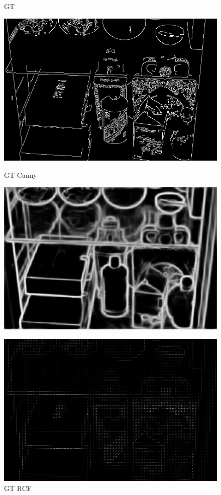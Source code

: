 \documentclass[CJK,aspectratio=169]{beamer}  %
\begin{document}
\begin{frame}
\begin{figure}
\begin{minipage}{.19\textwidth}
				\captionsetup{font=scriptsize}
				\label{fig: GI}
				\caption*{GT}
			\end{minipage}
			\begin{minipage}{.19\textwidth}
				\centering
				\includegraphics[width=.8\linewidth]{picture/LLIE/My Architecture/Edge Detection/normal00044_canny}
				\captionsetup{font=scriptsize}
				\label{fig: GT_canny}	
				\caption*{GT Canny}
			\end{minipage}
			\begin{minipage}{.19\textwidth}
				\centering
				\includegraphics[width=.8\linewidth]{picture/LLIE/My Architecture/Edge Detection/normal00044_rcf}
				\captionsetup{font=scriptsize}
				\label{fig: GT_rcf}	
				\caption*{GT RCF}
			\end{minipage}
			\begin{minipage}{.19\textwidth}
				\centering
				\includegraphics[width=.8\linewidth]{picture/LLIE/My Architecture/Edge Detection/normal00044_hog}

\end{minipage}
\end{figure}
\end{frame}
\end{document}
